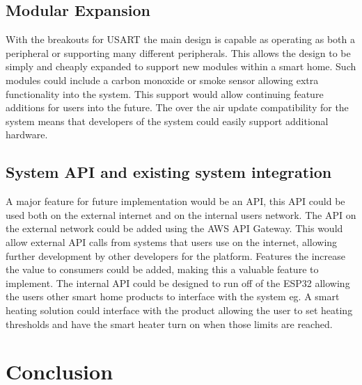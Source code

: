 \documentclass[12pt]{article}
\begin{document}
\subsection{Modular Expansion}
With the breakouts for USART the main design is capable as operating as both a peripheral or
supporting many different peripherals. This allows the design to be simply and cheaply expanded to
support new modules within a smart home. Such modules could include a carbon monoxide or smoke 
sensor allowing extra functionality into the system. This support would allow continuing feature
additions for users into the future. The over the air update compatibility for the system means
that developers of the system could easily support additional hardware.

\subsection{System API and existing system integration}
A major feature for future implementation would be an API, this API could be used both on the
external internet and on the internal users network. The API on the external network could be
added using the AWS API Gateway. This would allow external API calls from systems that users use
on the internet, allowing further development by other developers for the platform. Features the
increase the value to consumers could be added, making this a valuable feature to implement. The
internal API could be designed to run off of the ESP32 allowing the users other smart home
products to interface with the system eg. A smart heating solution could interface with the
product allowing the user to set heating thresholds and have the smart heater turn on when those
limits are reached.

\section{Conclusion}

\newpage
\end{document}

